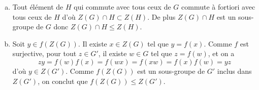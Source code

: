 \begin{enumerate}[a)]
\item Tout élément de $H$ qui commute avec tous ceux de $G$ commute à fortiori
avec tous ceux de $H$ d'où $Z(G)\cap H \subset Z(H)$. De plus $Z(G) \cap H$ est
un sous-groupe de $G$ donc $Z(G)\cap H\leqslant Z(H)$.

\item Soit $y\in f(Z(G))$. Il existe $x\in Z(G)$ tel que $y = f(x)$. Comme $f$
est surjective, pour tout $z\in G'$, il existe $w\in G$ tel que $z=f(w)$, et on
a 
\[
  zy = f(w)f(x) = f(wx) = f(xw) = f(x)f(w) = yz
\]
d'où $y\in Z(G')$. Comme $f(Z(G))$ est un sous-groupe de $G'$ inclus dans
$Z(G')$, on conclut que $f(Z(G))\leqslant Z(G')$.  
\end{enumerate}
